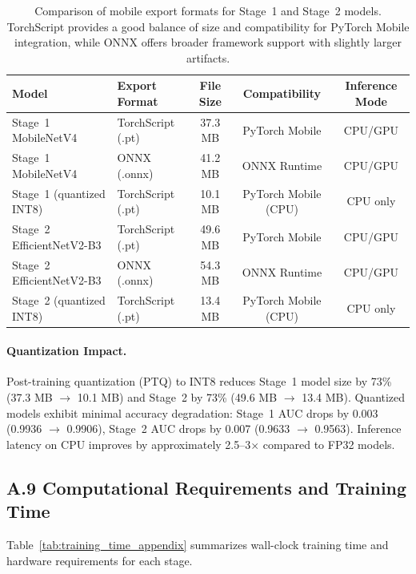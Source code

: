 \begin{table}[h]
  \centering
  \caption{Comparison of mobile export formats for Stage~1 and Stage~2 models. TorchScript provides a good balance of size and compatibility for PyTorch Mobile integration, while ONNX offers broader framework support with slightly larger artifacts.}
  \label{tab:export_artifact_comparison_appendix}
  {\scriptsize
  \setlength{\tabcolsep}{4pt}
  \begin{tabular}{@{}llccc@{}}
    \toprule
    Model & Export Format & File Size & Compatibility & Inference Mode \\
    \midrule
    Stage~1 MobileNetV4 & TorchScript (.pt) & 37.3 MB & PyTorch Mobile & CPU/GPU \\
    Stage~1 MobileNetV4 & ONNX (.onnx) & 41.2 MB & ONNX Runtime & CPU/GPU \\
    Stage~1 (quantized INT8) & TorchScript (.pt) & 10.1 MB & PyTorch Mobile (CPU) & CPU only \\
    \midrule
    Stage~2 EfficientNetV2-B3 & TorchScript (.pt) & 49.6 MB & PyTorch Mobile & CPU/GPU \\
    Stage~2 EfficientNetV2-B3 & ONNX (.onnx) & 54.3 MB & ONNX Runtime & CPU/GPU \\
    Stage~2 (quantized INT8) & TorchScript (.pt) & 13.4 MB & PyTorch Mobile (CPU) & CPU only \\
    \bottomrule
  \end{tabular}}
\end{table}

\paragraph{Quantization Impact.}
Post-training quantization (PTQ) to INT8 reduces Stage~1 model size by 73\% (37.3 MB $\rightarrow$ 10.1 MB) and Stage~2 by 73\% (49.6 MB $\rightarrow$ 13.4 MB). Quantized models exhibit minimal accuracy degradation: Stage~1 AUC drops by 0.003 (0.9936 $\rightarrow$ 0.9906), Stage~2 AUC drops by 0.007 (0.9633 $\rightarrow$ 0.9563). Inference latency on CPU improves by approximately 2.5--3$\times$ compared to FP32 models.

\subsection*{A.9 Computational Requirements and Training Time}

Table~\ref{tab:training_time_appendix} summarizes wall-clock training time and hardware requirements for each stage.

